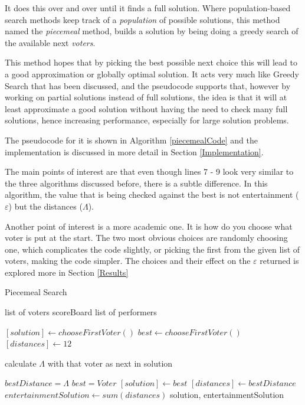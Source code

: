 \documentclass[12pt]{report}
\begin{document}
It does this over and over until it finds a full solution. Where population-based search methods keep track of a \textit{population} of possible solutions, this method named the \textit{piecemeal} method, builds a solution by being doing a greedy search of the available next \textit{voters}.

This method hopes that by picking the best possible next choice this will lead to a good approximation or globally optimal solution. It acts very much like Greedy Search that has been discussed, and the pseudocode supports that, however by working on partial solutions instead of full solutions, the idea is that it will at least approximate a good solution without having the need to check many full solutions, hence increasing performance, especially for large solution problems.

The pseudocode for it is shown in Algorithm \ref{piecemealCode} and the implementation is discussed in more detail in Section \ref{Implementation}.

The main points of interest are that even though lines 7 - 9 look very similar to the three algorithms discussed before, there is a subtle difference. In this algorithm, the value that is being checked against the best is not entertainment ($\varepsilon$) but the distances ($\Lambda$).

Another point of interest is a more academic one. It is how do you choose what voter is put at the start. The two most obvious choices are randomly choosing one, which complicates the code slightly, or picking the first from the given list of voters, making the code simpler. The choices and their effect on the $\varepsilon$ returned is explored more in Section \ref{Results}

\begin{algorithm}
\caption{Piecemeal Search}
\label{piecemealCode}
\begin{algorithmic}[1]
\REQUIRE list of voters
\REQUIRE scoreBoard
\REQUIRE list of performers

\STATE $[solution] \leftarrow chooseFirstVoter()$
\STATE $best \leftarrow chooseFirstVoter()$
\STATE $[distances] \leftarrow 12$

\STATE calculate $\Lambda$ with that voter as next in solution

\STATE $bestDistance= \Lambda$
\STATE $best = Voter$
\ENDIF
\ENDFOR
\STATE $[solution] \leftarrow best$
\STATE $[distances] \leftarrow bestDistance$
\ENDFOR
\STATE $entertainmentSolution \leftarrow sum(distances)$
\RETURN solution, entertainmentSolution
\end{algorithmic}
\end{algorithm}
\end{document}
